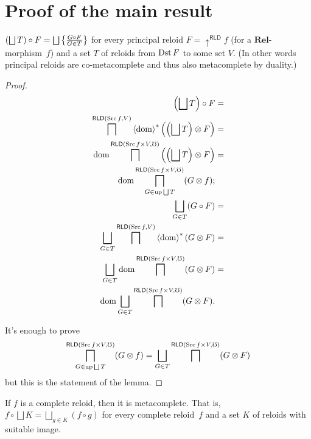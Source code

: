 \section{Proof of the main result}
\begin{lem}
$\left(\bigsqcup T\right)\circ F=\bigsqcup\setcond{G\circ F}{G\in T}$
for every principal reloid $F=\uparrow^{\mathsf{RLD}}f$ (for a $\mathbf{Rel}$-morphism~$f$)
and a set $T$ of reloids from $\operatorname{Dst} F$ to some set $V$. (In other
words principal reloids are co-metacomplete and thus also metacomplete
by duality.)\end{lem}
\begin{proof}
~
\begin{align*}
\left(\bigsqcup T\right)\circ F & =\\
\bigsqcap^{\mathsf{RLD}(\Src f,V)}\rsupfun{\dom}\left(\left(\bigsqcup T\right)\otimes F\right) & =\\
\dom\bigsqcap^{\mathsf{RLD}(\Src f\times V,\mho)}\left(\left(\bigsqcup T\right)\otimes F\right) & =\\
\dom\bigsqcap_{G\in\up\bigsqcup T}^{\mathsf{RLD}(\Src f\times V,\mho)}(G\otimes f);\\
\bigsqcup_{G\in T}(G\circ F) & =\\
\bigsqcup_{G\in T}\bigsqcap^{\mathsf{RLD}(\Src f,V)}\rsupfun{\dom}(G\otimes F) & =\\
\bigsqcup_{G\in T}\dom\bigsqcap^{\mathsf{RLD}(\Src f\times V,\mho)}(G\otimes F) & =\\
\dom\bigsqcup_{G\in T}\bigsqcap^{\mathsf{RLD}(\Src f\times V,\mho)}(G\otimes F).
\end{align*}


It's enough to prove
\[
\bigsqcap_{G\in\up\bigsqcup T}^{\mathsf{RLD}(\Src f\times V,\mho)}(G\otimes f)=\bigsqcup_{G\in T}\bigsqcap^{\mathsf{RLD}(\Src f\times V,\mho)}(G\otimes F)
\]
but this is the statement of the lemma.
\end{proof}

\begin{thm}
If $f$ is a complete reloid, then it is metacomplete. That is,
$f\circ\bigsqcup K=\bigsqcup_{g\in K}(f\circ g)$ for every complete reloid~$f$
and a set $K$ of reloids with suitable image.
\end{thm}

